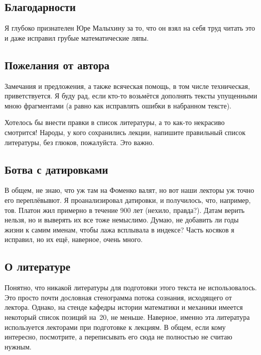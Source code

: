 \documentclass[a4paper,oneside,fleqn,10pt]{article}
\begin{document}
\subsection*{Благодарности}

Я глубоко признателен Юре Малыхину за то, что он взял на себя труд
читать это и даже исправил грубые математические ляпы.

\subsection*{Пожелания от автора}

Замечания и предложения, а также всяческая помощь, в том числе
техническая, приветствуется.  Я буду рад, если кто-то возьмётся
дополнять тексты упущенными мною фрагментами (а равно как исправлять
ошибки в набранном тексте).

Хотелось бы внести правки в список литературы, а то как-то некрасиво
смотрится!  Народы, у кого сохранились лекции, напишите правильный
список литературы, без глюков, пожалуйста. Это важно.

\subsection*{Ботва с датировками}

В общем, не знаю, что уж там на Фоменко валят, но вот наши лекторы уж
точно его переплёвывют.  Я проанализировал датировки, и получилось,
что, например, тов. Платон жил примерно в течение 900 лет (нехило,
правда?).  Датам верить нельзя, но и выверять их все тоже
немыслимо. Думаю, не добавить ли годы жизни к самим именам, чтобы лажа
всплывала в индексе?  Часть косяков я исправил, но их ещё, наверное,
очень много.

\subsection*{О литературе}

Понятно, что никакой литературы для подготовки этого текста не
использовалось.  Это просто почти дословная стенограмма потока
сознания, исходящего от лектора.  Однако, на стенде кафедры истории
математики и механики имеется некоторый список позиций на~20, не
меньше. Наверное, именно эта литература используется лекторами при
подготовке к лекциям. В общем, если кому интересно, посмотрите, а
переписывать его сюда не полностью не считаю нужным.

\medskip
\dmvntrail
\end{document}
